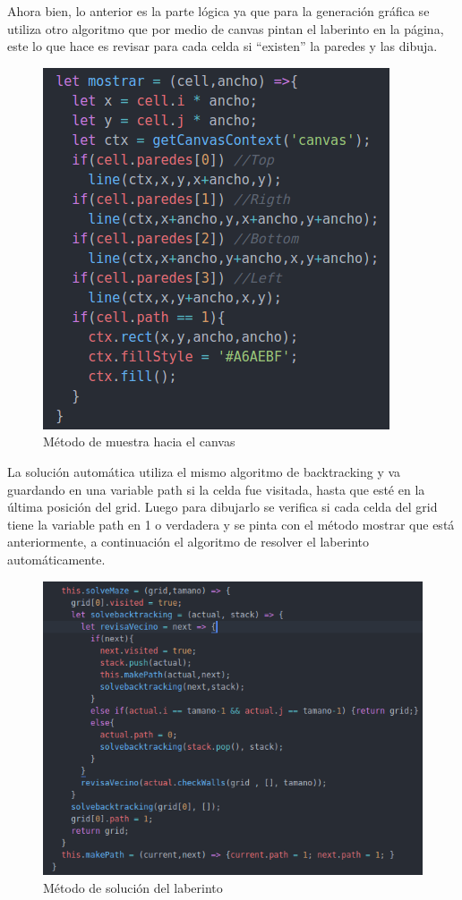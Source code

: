 \documentclass[11pt]{article}
\begin{document}
Ahora bien, lo anterior es la parte lógica ya que para la generación gráfica se utiliza otro algoritmo que por medio de canvas pintan el laberinto en la página, este lo que hace es revisar para cada celda si “existen” la paredes y las dibuja. \\

\begin{figure}[H] 
\includegraphics[scale=0.5]{draw}
\centering
\caption{Método de muestra hacia el canvas}
\end{figure}

La solución automática utiliza el mismo algoritmo de backtracking y va guardando en una variable path si la celda fue visitada, hasta que esté en la última posición del grid. Luego para dibujarlo se verifica si cada celda del grid tiene la variable path en 1 o verdadera y se pinta con el método mostrar que está anteriormente, a continuación el algoritmo de resolver el laberinto automáticamente.

\begin{figure}[H] 
\includegraphics[scale=0.5]{solve}
\centering
\caption{Método de solución del laberinto}
\end{figure}
\end{document}
